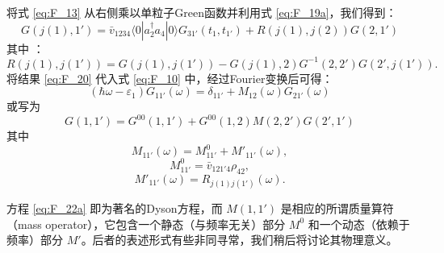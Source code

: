 将式 \ref{eq:F_13} 从右侧乘以单粒子Green函数并利用式 \ref{eq:F_19a}，我们得到：
\begin{equation}
G(j(1),1')=\bar{v}_{1234}\langle0|a^{\dagger}_{2}a_{4}|0\rangle G_{31'}(t_{1},t_{1'})+R(j(1),j(2))G(2,1')\label{eq:F_20}
\end{equation}
其中 \cite{ES69}：
\begin{equation}
R(j(1),j(1'))=G(j(1),j(1'))-G(j(1),2)G^{-1}(2,2')G(2',j(1')).\label{eq:F_21}
\end{equation}
将结果 \ref{eq:F_20} 代入式 \ref{eq:F_10} 中，经过Fourier变换后可得：
\begin{equation}
(\hbar\omega-\varepsilon_{1})G_{11'}(\omega)=\delta_{11'}+M_{12}(\omega)G_{21'}(\omega)\label{eq:F_22a}
\end{equation}
或写为
\begin{equation}
G(1,1')=G^{00}(1,1')+G^{00}(1,2)M(2,2')G(2',1')\label{eq:F_22b}
\end{equation}
其中
\begin{equation}
M_{11'}(\omega)=M^{0}_{11'}+M'_{11'}(\omega),\label{eq:F_23}
\end{equation}
\begin{equation}
M^{0}_{11'}=\bar{v}_{121'4}\rho_{42},\label{eq:F_24}
\end{equation}
\begin{equation}
M'_{11'}(\omega)=R_{j(1)j(1')}(\omega).\label{eq:F_25}
\end{equation}

方程 \ref{eq:F_22a} 即为著名的Dyson方程，而 $M(1,1')$ 是相应的所谓质量算符（mass operator），它包含一个静态（与频率无关）部分
$M^{0}$ 和一个动态（依赖于频率）部分 $M'$。后者的表述形式有些非同寻常，我们稍后将讨论其物理意义。

